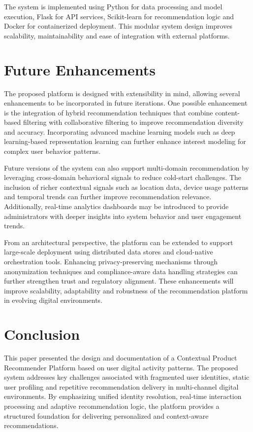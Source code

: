 \documentclass[conference]{IEEEtran}
\begin{document}
The system is implemented using Python for data processing and model execution, Flask for API services, Scikit-learn for recommendation logic and Docker for containerized deployment. This modular system design improves scalability, maintainability and ease of integration with external platforms.

\section{Future Enhancements}
The proposed platform is designed with extensibility in mind, allowing several enhancements to be incorporated in future iterations. One possible enhancement is the integration of hybrid recommendation techniques that combine content-based filtering with collaborative filtering to improve recommendation diversity and accuracy. Incorporating advanced machine learning models such as deep learning-based representation learning can further enhance interest modeling for complex user behavior patterns.

Future versions of the system can also support multi-domain recommendation by leveraging cross-domain behavioral signals to reduce cold-start challenges. The inclusion of richer contextual signals such as location data, device usage patterns and temporal trends can further improve recommendation relevance. Additionally, real-time analytics dashboards may be introduced to provide administrators with deeper insights into system behavior and user engagement trends.

From an architectural perspective, the platform can be extended to support large-scale deployment using distributed data stores and cloud-native orchestration tools. Enhancing privacy-preserving mechanisms through anonymization techniques and compliance-aware data handling strategies can further strengthen trust and regulatory alignment. These enhancements will improve scalability, adaptability and robustness of the recommendation platform in evolving digital environments.

\section{Conclusion}
This paper presented the design and documentation of a Contextual Product Recommender Platform based on user digital activity patterns. The proposed system addresses key challenges associated with fragmented user identities, static user profiling and repetitive recommendation delivery in multi-channel digital environments. By emphasizing unified identity resolution, real-time interaction processing and adaptive recommendation logic, the platform provides a structured foundation for delivering personalized and context-aware recommendations.
\end{document}
